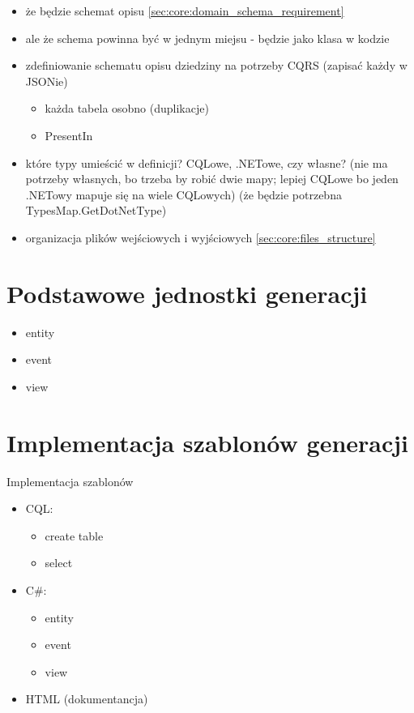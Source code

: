 \begin{itemize}
 \item że będzie schemat opisu \ref{sec:core:domain_schema_requirement}
 \item ale że schema powinna być w jednym miejsu - będzie jako klasa w kodzie
 \item zdefiniowanie schematu opisu dziedziny na potrzeby CQRS (zapisać każdy w JSONie)
  \begin{itemize}
   \item każda tabela osobno (duplikacje)
   \item PresentIn
  \end{itemize}
 \item które typy umieścić w definicji? CQLowe, .NETowe, czy własne? (nie ma potrzeby własnych, bo trzeba by robić dwie mapy; lepiej CQLowe bo jeden .NETowy mapuje się na wiele CQLowych) (że będzie potrzebna TypesMap.GetDotNetType)
 \item organizacja plików wejściowych i wyjściowych \ref{sec:core:files_structure}
\end{itemize}



\section{Podstawowe jednostki generacji}

\begin{itemize}
 \item entity
 \item event
 \item view
\end{itemize}



\section{Implementacja szablonów generacji}

Implementacja szablonów

\begin{itemize}
 \item CQL:
  \begin{itemize}
   \item create table
   \item select
  \end{itemize}
 \item C\#:
  \begin{itemize}
   \item entity
   \item event
   \item view
  \end{itemize}
 \item HTML (dokumentancja)
\end{itemize}

